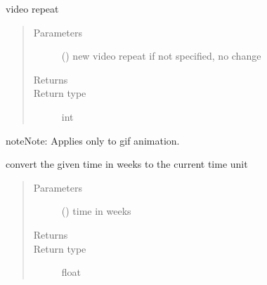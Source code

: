 \documentclass[letterpaper,10pt,english]{sphinxmanual}
\begin{document}
\begin{fulllineitems}
\begin{fulllineitems}
\end{fulllineitems}


\begin{fulllineitems}
\label{\detokenize{Reference:salabim.Environment.video_repeat}}
video repeat
\begin{quote}\begin{description}
\item[{Parameters}] \leavevmode
{} () \textendash{} new video repeat 
if not specified, no change

\item[{Returns}] \leavevmode
{}

\item[{Return type}] \leavevmode
int

\end{description}\end{quote}

\begin{sphinxadmonition}{note}{Note:}
Applies only to gif animation.
\end{sphinxadmonition}

\end{fulllineitems}


\begin{fulllineitems}
\label{\detokenize{Reference:salabim.Environment.weeks}}
convert the given time in weeks to the current time unit
\begin{quote}\begin{description}
\item[{Parameters}] \leavevmode
{} () \textendash{} time in weeks

\item[{Returns}] \leavevmode
{}

\item[{Return type}] \leavevmode
float

\end{description}\end{quote}


\end{fulllineitems}
\end{fulllineitems}
\end{document}

